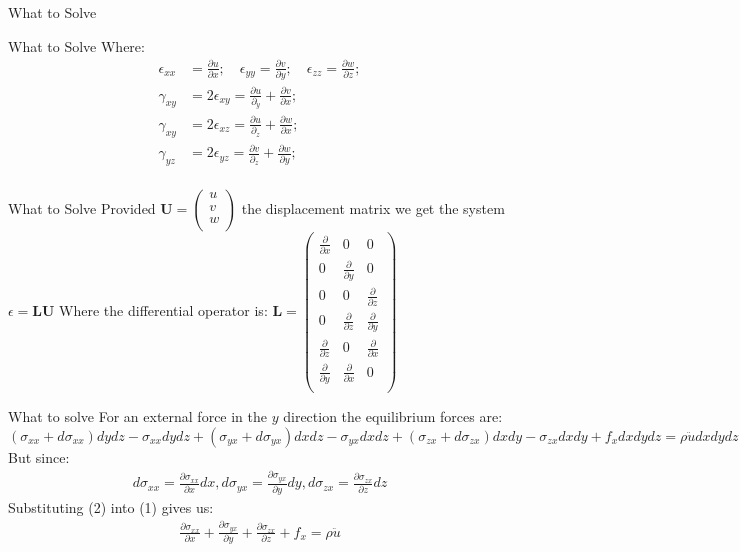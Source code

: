 \documentclass{beamer}
\begin{document}
\begin{section}{What to Solve}
\begin{frame}{What to Solve}
    Where:
    \begin{align*}
        \epsilon_{xx} &= \frac{\partial u }{\partial x}; \quad \epsilon_{yy} = \frac{\partial v}{\partial y}; \quad \epsilon_{zz} = \frac{\partial w}{\partial z};\\
        \gamma_{xy} &= 2\epsilon_{xy} = \frac{\partial u}{\partial_y} + \frac{\partial v}{\partial x}; \\
        \gamma_{xy} &= 2\epsilon_{xz} = \frac{\partial u}{\partial_z} + \frac{\partial w}{\partial x}; \\
        \gamma_{yz} &= 2\epsilon_{yz} = \frac{\partial v}{\partial_z} + \frac{\partial w}{\partial y}; \\
    \end{align*}
\end{frame}
\begin{frame}{What to Solve}
    Provided $\textbf{U} = \begin{pmatrix}
        u\\
        v\\
        w\\
    \end{pmatrix}$ the displacement matrix we get the system $\epsilon = \textbf{LU}$
    Where the differential operator is:
    $\textbf{L} = \begin{pmatrix}
        \frac{\partial}{\partial x} & 0 & 0\\
        0 & \frac{\partial}{ \partial y} & 0\\
        0 & 0 & \frac{\partial}{\partial z}\\
        0 & \frac{\partial}{\partial z} & \frac{\partial}{\partial y} \\
        \frac{\partial}{\partial z} & 0 & \frac{\partial}{\partial x} \\
        \frac{\partial}{\partial y} & \frac{\partial}{\partial x} & 0 \\
    \end{pmatrix}$

\end{frame}
\begin{frame}{What to solve}
    For an external force in the $y$ direction the equilibrium forces are:
    \begin{dmath}
        (\sigma_{xx}+d\sigma_{xx})dydz - \sigma_{xx}dydz + (\sigma_{yx}+d\sigma_{yx}) dxdz - \sigma_{yx}dxdz + (\sigma_{zx}+d\sigma_{zx})dxdy - \sigma_{zx}dxdy + f_x dx dy dz = \rho \ddot{u} dx dy dz
    \end{dmath}
    But since:
    \begin{align}
        d\sigma_{xx} = \frac{\partial \sigma_{xx}}{\partial x}dx , d\sigma_{yx} = \frac{\partial \sigma_{yx}}{\partial y}dy, d\sigma_{zx} = \frac{\partial \sigma_{zx}}{\partial z} dz
    \end{align}
    Substituting (2) into (1) gives us:
    \begin{align}
        \frac{\partial \sigma_{xx}}{\partial x} + \frac{\partial \sigma_{yx}}{\partial y} + \frac{\partial \sigma_{zx}}{\partial z} + f_x = \rho \ddot{u}
    \end{align}


\end{frame}
\end{section}
\end{document}
